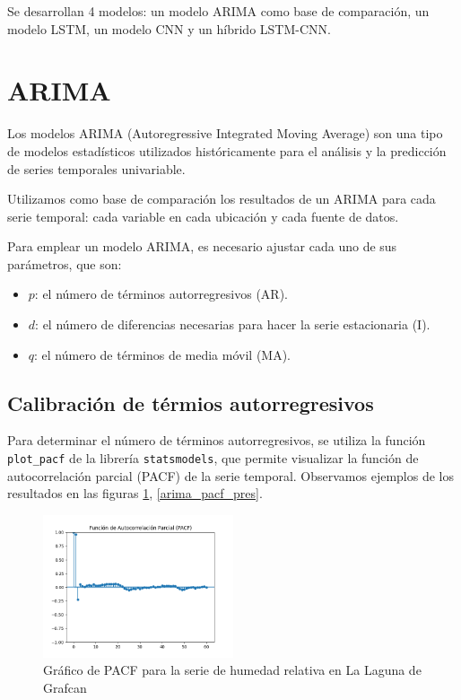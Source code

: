 Se desarrollan 4 modelos: un modelo ARIMA como base de comparación, un modelo LSTM, un modelo CNN y un híbrido LSTM-CNN.

\section{ARIMA}
Los modelos ARIMA (Autoregressive Integrated Moving Average) son una tipo de modelos estadísticos utilizados históricamente para el análisis y la predicción de series temporales
univariable. 

Utilizamos como base de comparación los resultados de un ARIMA para cada serie temporal: cada variable en cada ubicación y cada fuente de datos.

Para emplear un modelo ARIMA, es necesario ajustar cada uno de sus parámetros, que son:
\begin{itemize}
    \item $p$: el número de términos autorregresivos (AR).
    \item $d$: el número de diferencias necesarias para hacer la serie estacionaria (I).
    \item $q$: el número de términos de media móvil (MA).
\end{itemize}

\subsection{Calibración de térmios autorregresivos}
Para determinar el número de términos autorregresivos, se utiliza la función \texttt{plot\_pacf} de la librería \texttt{statsmodels}, 
que permite visualizar la función de autocorrelación parcial (PACF) de la serie temporal. Observamos ejemplos de los resultados en las figuras \ref{arima_pacf_hum}, \ref{arima_pacf_pres}. 

\begin{figure}[H]
    \centering
    \includegraphics[width=0.5\textwidth]{images/arima_pacf_hum.png}
    \caption{Gráfico de PACF para la serie de humedad relativa en La Laguna de Grafcan}
    \label{arima_pacf_hum}
\end{figure}

